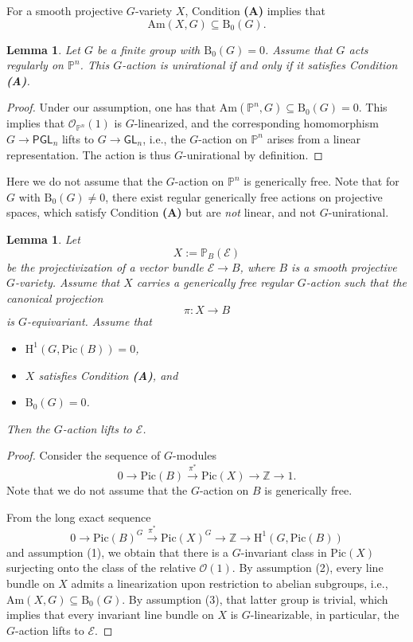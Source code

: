 \documentclass[12pt,reqno]{amsart}
\theoremstyle{plain}
\newtheorem{lemm}[prop]{Lemma}
\theoremstyle{remark}
\theoremstyle{definition}
\numberwithin{equation}{section}
\def\cO{{\mathcal O}}
\def\bP{{\mathbb P}}
\def\bZ{{\mathbb Z}}
\def\rH{{\mathrm H}}
\def\Pic{\mathrm{Pic}}
\def\GL{\mathsf{GL}}
\def\PGL{\mathsf{PGL}}
\begin{document}
For a smooth projective $G$-variety $X$,  
Condition {\bf (A)} implies that 
$$
\mathrm{Am}(X,G)\subseteq \mathrm{B}_0(G). 
$$


\begin{lemm}
\label{lemm:pn}
Let $G$ be a finite group with $\mathrm{B}_0(G)=0$. Assume that $G$ acts regularly on $\bP^n$. This $G$-action is unirational if and only if it satisfies Condition {\bf (A)}.  
\end{lemm}


\begin{proof}
Under our assumption, one has that
$
\mathrm{Am}(\bP^n,G)\subseteq \mathrm{B}_0(G)=0.
$
This implies that $\cO_{\bP^n}(1)$ is $G$-linearized, and the corresponding homomorphism $G\to \PGL_n$ lifts to $G\to \GL_n$, i.e., the $G$-action on $\bP^n$ arises from a linear representation. The action is thus $G$-unirational by definition. 
\end{proof}

Here we do not assume that the $G$-action on $\bP^n$ is generically free. Note that for $G$ with $\mathrm{B}_0(G)\neq 0$, there exist regular generically free actions on projective spaces, which satisfy Condition {\bf (A)} but are {\em not} linear, and not $G$-unirational.  




\begin{lemm}
\label{lemm:line}
Let 
$$
X:=\bP_B(\mathcal E) 
$$
be
the projectivization of a vector bundle $\mathcal E\to B$, where $B$ is a smooth projective $G$-variety. 
Assume that $X$ carries a generically free regular $G$-action such that the canonical projection 
$$
\pi: X\to B
$$
is $G$-equivariant. Assume that 
\begin{itemize}
\item[(1)] $\rH^1(G,\Pic(B))=0$, 
\item[(2)] $X$ satisfies Condition {\bf (A)}, and 
\item[(3)] $\mathrm{B}_0(G)=0$.
\end{itemize}
Then the $G$-action lifts to $\mathcal E$. 
\end{lemm}



\begin{proof}
Consider the sequence of $G$-modules
$$
0\to \Pic(B)\stackrel{\pi^*}{\longrightarrow} \Pic(X)\to \bZ\to 1. 
$$
Note that we do not assume that the $G$-action on $B$ is generically free.

From the long exact sequence
$$
0\to \Pic(B)^G\stackrel{\pi^*}{\longrightarrow} \Pic(X)^G\to \bZ\to \rH^1(G, \Pic(B))
$$
and assumption (1), we obtain that there is a $G$-invariant class in $\Pic(X)$ surjecting onto the class of the relative $\mathcal O(1)$.  By assumption (2), every line bundle on $X$ admits a linearization upon restriction to abelian subgroups, i.e., $\mathrm{Am}(X,G)\subseteq \mathrm{B}_0(G)$. By assumption (3), that latter group is trivial, which implies that 
every invariant line bundle on $X$ is $G$-linearizable, in particular, the $G$-action lifts to $\mathcal E$.  
\end{proof}
\end{document}
